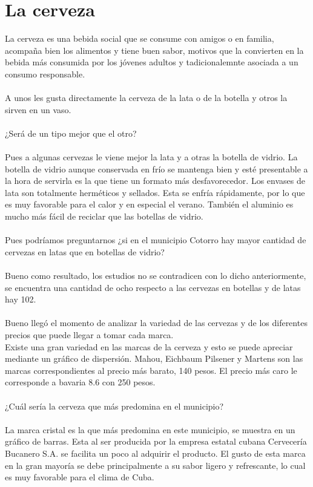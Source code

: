 \documentclass{article}
\begin{document}
    \part*{La cerveza}
    La cerveza es una bebida social que se consume con amigos o en familia, acompaña bien los alimentos y tiene buen sabor, motivos que la convierten en la bebida más consumida por los jóvenes adultos y tadicionalemnte asociada a un consumo responsable.\\
    \\
    A unos les gusta directamente la cerveza de la lata o de la botella y otros la sirven en un vaso.\\
    \\
    ¿Será de un tipo mejor que el otro?\\
    \\
    Pues a algunas cervezas le viene mejor la lata y a otras la botella de vidrio. La botella de vidrio aunque conservada en frío se mantenga bien y esté presentable a la hora de servirla es la que tiene un formato más desfavorecedor. Los envases de lata son totalmente herméticos y sellados. Esta se enfría rápidamente, por lo que es muy favorable para el calor y en especial el verano. También el aluminio es mucho más fácil de reciclar que las botellas de vidrio.\\
    \\
    Pues podríamos preguntarnos ¿si en el municipio Cotorro hay mayor cantidad de cervezas en latas que en botellas de vidrio?\\
    \\
    Bueno como resultado, los estudios no se contradicen con lo dicho anteriormente, se encuentra una cantidad de ocho respecto a las cervezas en botellas y de latas hay 102.\\
    \\
    Bueno llegó el momento de analizar la variedad de las cervezas y de los diferentes precios que puede llegar a tomar cada marca.\\
    Existe una gran variedad en las marcas de la cerveza y esto se puede apreciar mediante un gráfico de dispersión. Mahou, Eichbaum Pilsener y Martens son las marcas correspondientes al precio más barato, 140 pesos. El precio más caro le corresponde a bavaria 8.6 con 250 pesos.\\
    \\
    ¿Cuál sería la cerveza que más predomina en el municipio?\\
    \\
    La marca cristal es la que más predomina en este municipio, se muestra en un gráfico de barras. Esta al ser producida por la empresa estatal cubana Cervecería Bucanero S.A. se facilita un poco al adquirir el producto. El gusto de esta marca en la gran mayoría se debe principalmente a su sabor ligero y refrescante, lo cual es muy favorable para el clima de Cuba.\\
    \newpage
\end{document}

